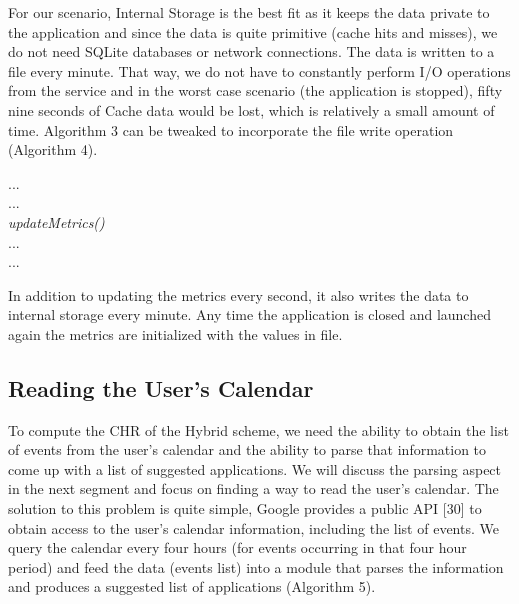 \documentclass[12pt]{uthesis-v12}  %
\begin{document}
			For our scenario, Internal Storage is the best fit as it keeps the data private to the application and since the data is quite primitive (cache hits and misses), we do not need SQLite databases or network connections. The data is written to a file every minute. That way, we do not have to constantly perform I/O operations from the service and in the worst case scenario (the application is stopped), fifty nine seconds of Cache data would be lost, which is relatively a small amount of time. Algorithm 3 can be tweaked to incorporate the file write operation (Algorithm 4).
			
			\begin{algorithm}[H]
				\SetAlgoLined
				
				{	
					...\\
					...\\
					{\em updateMetrics()}\\
					...\\
					...\\	
				}
				
				\caption[Modified Update Metrics Algorithm]{In addition to updating the metrics every second, it also writes the data to internal storage every minute. Any time the application is closed and launched again the metrics are initialized with the values in file.}
			\end{algorithm}
			
		\subsection{Reading the User's Calendar}
			To compute the CHR of the Hybrid scheme, we need the ability to obtain the list of events from the user's calendar and the ability to parse that information to come up with a list of suggested applications. We will discuss the parsing aspect in the next segment and focus on finding a way to read the user's calendar. The solution to this problem is quite simple, Google provides a public API [30] to obtain access to the user's calendar information, including the list of events. We query the calendar every four hours (for events occurring in that four hour period) and feed the data (events list) into a module that parses the information and produces a suggested list of applications (Algorithm 5). 
			
\end{document}
